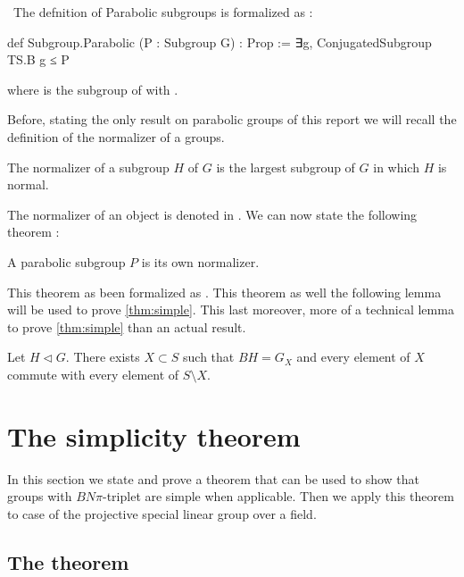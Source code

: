 \begin{implementation} \
    The defnition of Parabolic subgroups is formalized as :
\begin{leancode}
def Subgroup.Parabolic (P : Subgroup G) : Prop := ∃g, ConjugatedSubgroup TS.B g ≤ P
\end{leancode}
where  is the subgroup of  with .
\end{implementation} 

Before, stating the only result on parabolic groups of this report we will recall the definition of the normalizer of a groups.

\begin{definition}
    The normalizer of a subgroup $H$ of $G$ is the largest subgroup of $G$ in which $H$ is normal.
\end{definition}

The normalizer of an object  is denoted  in \Lean. We can now state the following theorem :
\begin{theoreme}\label{thm:parabolic}
    A parabolic subgroup $P$ is its own normalizer.
\end{theoreme}

This theorem as been formalized as . This theorem as well the following lemma will be used to prove \ref{thm:simple}. This last moreover, more of a technical lemma to prove \ref{thm:simple} than an actual result.

\begin{lemme} \label{lem:2}
Let $H \triangleleft G$. There exists $X \subset S$ such that $BH = G_X$ and every element of $X$ commute with every element of $S \setminus X$.
\end{lemme}

\section{The simplicity theorem}%
\label{sec:simple}

In this section we state and prove a theorem that can be used to show that groups with $BN\pi$-triplet are simple when applicable. Then we apply this theorem to case of the projective special linear group over a field.

\subsection{The theorem}

